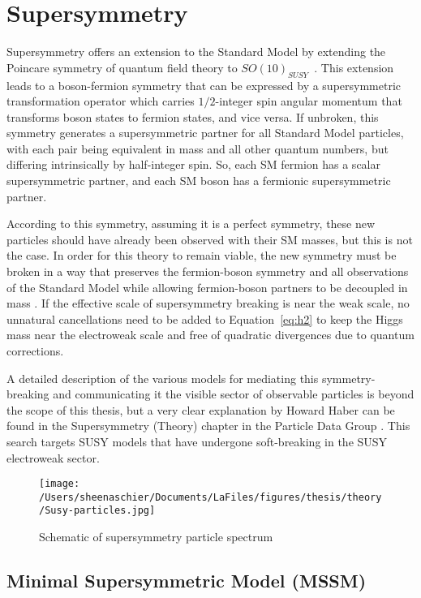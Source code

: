 \section{Supersymmetry}
\label{sec:susy}
Supersymmetry offers an extension to the Standard Model by extending the Poincare symmetry of quantum field theory to $SO(10)_{SUSY}$~\cite{Martin:1997ns}.  This extension leads to a boson-fermion symmetry that can be expressed by a supersymmetric transformation operator which carries $1/2$-integer spin angular momentum that transforms boson states to fermion states, and vice versa.  If unbroken, this symmetry generates a supersymmetric partner for all Standard Model particles, with each pair being equivalent in mass and all other quantum numbers, but differing intrinsically by half-integer spin.  So, each SM fermion has a scalar supersymmetric partner, and each SM boson has a fermionic supersymmetric partner.  

According to this symmetry, assuming it is a perfect symmetry, these new particles should have already been observed with their SM masses, but this is not the case.  In order for this theory to remain viable, the new symmetry must be broken in a way that preserves the fermion-boson symmetry and all observations of the Standard Model while allowing fermion-boson partners to be decoupled in mass \cite{HAAG1975257}.  If the effective scale of supersymmetry breaking is near the weak scale, no unnatural cancellations need to be added to Equation~\ref{eq:h2} to keep the Higgs mass near the electroweak scale and free of quadratic divergences due to quantum corrections.  

A detailed description of the various models for mediating this symmetry-breaking and communicating it the visible sector of observable particles is beyond the scope of this thesis, but a very clear explanation by Howard Haber can be found in the Supersymmetry (Theory) chapter in the Particle Data Group \cite{haber}.   This search targets SUSY models that have undergone soft-breaking in the SUSY electroweak sector. 

  \begin{figure}[tbp]
    \centering
 \texttt{[image: /Users/sheenaschier/Documents/LaFiles/figures/thesis/theory/Susy-particles.jpg]}
    \caption{Schematic of supersymmetry particle spectrum}
   \label{fig:susy}
 \end{figure}

\subsection{Minimal Supersymmetric Model (MSSM)}

